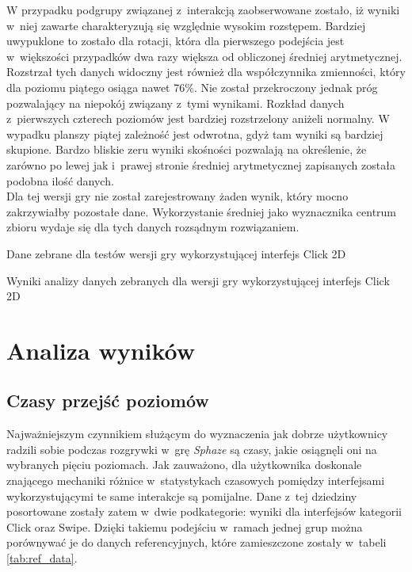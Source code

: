 \documentclass[a4paper,12pt,numbers=noenddot]{report}
\begin{document}
W przypadku podgrupy związanej z~interakcją zaobserwowane zostało, iż wyniki w~niej zawarte charakteryzują się względnie wysokim rozstępem. Bardziej uwypuklone to zostało dla rotacji, która dla pierwszego podejścia jest w~większości przypadków dwa razy większa od obliczonej średniej arytmetycznej. Rozstrzał tych danych widoczny jest również dla współczynnika zmienności, który dla poziomu piątego osiąga nawet 76\%. Nie został przekroczony jednak próg pozwalający na niepokój związany z~tymi wynikami. Rozkład danych z~pierwszych czterech poziomów jest bardziej rozstrzelony aniżeli normalny. W wypadku planszy piątej zależność jest odwrotna, gdyż tam wyniki są bardziej skupione. Bardzo bliskie zeru wyniki skośności pozwalają na określenie, że zarówno po lewej jak i~prawej stronie średniej arytmetycznej zapisanych została podobna ilość danych.\\

Dla tej wersji gry nie został zarejestrowany żaden wynik, który mocno zakrzywiałby pozostałe dane. Wykorzystanie średniej jako wyznacznika centrum zbioru wydaje się dla tych danych rozsądnym rozwiązaniem.



\begin{table}
  \caption{Dane zebrane dla testów wersji gry wykorzystującej interfejs Click 2D}
  \resizebox{\textwidth}{!}{%
	
  }
  \label{tab:results_Click2d}%
  \caption{Wyniki analizy danych zebranych dla wersji gry wykorzystującej interfejs Click 2D}
  \resizebox{\textwidth}{!}{%
	
  }
  \label{tab:analysis_Click2d}%
\end{table}%

\section{Analiza wyników}
\subsection{Czasy przejść poziomów}
Najważniejszym czynnikiem służącym do wyznaczenia jak dobrze użytkownicy radzili sobie podczas rozgrywki w~grę \textit{Sphaze} są czasy, jakie osiągnęli oni na wybranych pięciu poziomach. Jak zauważono, dla użytkownika doskonale znającego mechaniki różnice w~statystykach czasowych pomiędzy interfejsami wykorzystującymi te same interakcje są pomijalne. Dane z~tej dziedziny posortowane zostały zatem w~dwie podkategorie: wyniki dla interfejsów kategorii Click oraz Swipe. Dzięki takiemu podejściu w~ramach jednej grup można porównywać je do danych referencyjnych, które zamieszczone zostały w~tabeli \ref{tab:ref_data}. 
\end{document}
